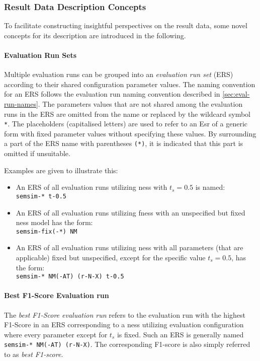 \documentclass[11pt]{scrreprt}
\begin{document}
{\subsubsection{Result Data Description Concepts}
To facilitate constructing insightful perspectives on the result data, some novel concepts for its description are introduced in the following.

\paragraph{Evaluation Run Sets}
Multiple evaluation runs can be grouped into an \textit{evaluation run set} (ERS) according to their shared configuration parameter values. The naming convention for an ERS follows the evaluation run naming convention described in \cref{sec:eval-run-names}. The parameters values that are not shared among the evaluation runs in the ERS are omitted from the name or replaced by the wildcard symbol \texttt{*}. The placeholders (capitalised letters) are used to refer to an E\gls{sr} of a generic form with fixed parameter values without specifying these values.  By surrounding a part of the ERS name with parentheses \texttt{(*)}, it is indicated that this part is omitted if unsuitable. 

Examples are given to illustrate this:
\begin{itemize}
	\item An ERS of all evaluation runs utilizing \gls{ness} with \(t_s = 0.5\) is named: \\ \texttt{semsim-* t-0.5}
	\item An ERS of all evaluation runs utilizing \gls{fness} with an unspecified but fixed \gls{ness} model has the form: \\ \texttt{semsim-fix(-*) NM} 
	\item An ERS of all evaluation runs utilizing \gls{ness} with all parameters (that are applicable) fixed but unspecified, except for the specific value \(t_s = 0.5\), has the form: \\ \texttt{semsim-* NM(-AT) (r-N-X) t-0.5}
\end{itemize}

\paragraph{Best F1-Score Evaluation run} The \textit{best F1-Score evaluation run} refers to the evaluation run with the highest F1-Score in an ERS corresponding to a \gls{ness} utilizing evaluation configuration where every parameter except for \(t_s\) is fixed. Such an ERS is generally named \texttt{semsim-* NM(-AT) (r-N-X)}. The corresponding F1-score is also simply referred to as \textit{best F1-score}.

}
\end{document}
